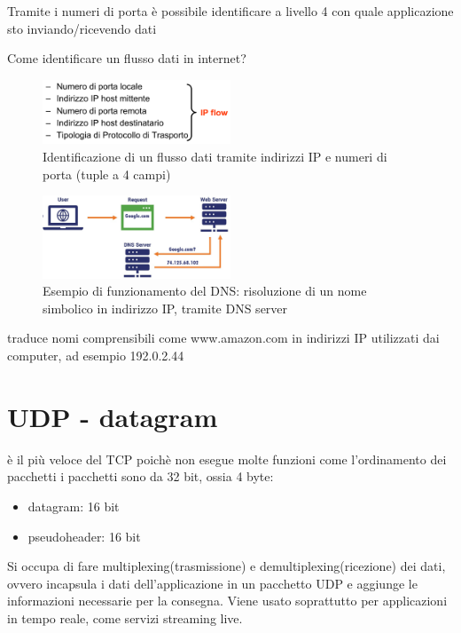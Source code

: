 Tramite i numeri di porta è possibile identificare a livello 4 con quale applicazione sto inviando/ricevendo dati

Come identificare un flusso dati in internet?

\begin{figure}[h!]
    \centering
    \includegraphics[width=0.5\textwidth]{images/flusso_IP.png}
    \caption{Identificazione di un flusso dati tramite indirizzi IP e numeri di porta (tuple a 4 campi)}
    \label{fig:flussoIP}
\end{figure}

\begin{figure}[h!]
    \centering
    \includegraphics[width=0.5\textwidth]{images/DNS.jpg}
    \caption{Esempio di funzionamento del DNS: risoluzione di un nome simbolico in indirizzo IP, tramite DNS server}
    \label{fig:dns_example}
\end{figure}
traduce nomi comprensibili come www.amazon.com in indirizzi IP utilizzati dai computer, ad esempio 192.0.2.44
\newpage
\section{UDP - datagram}

è il più veloce del TCP poichè non esegue molte funzioni come l'ordinamento dei pacchetti 
i pacchetti sono da 32 bit, ossia 4 byte:
\begin{itemize}
    \item datagram: 16 bit
    \item pseudoheader: 16 bit
\end{itemize}

Si occupa di fare multiplexing(trasmissione) e demultiplexing(ricezione) dei dati, ovvero incapsula i dati dell'applicazione in un pacchetto UDP e aggiunge le informazioni necessarie per la consegna.
Viene usato soprattutto per applicazioni in tempo reale, come servizi streaming live.

